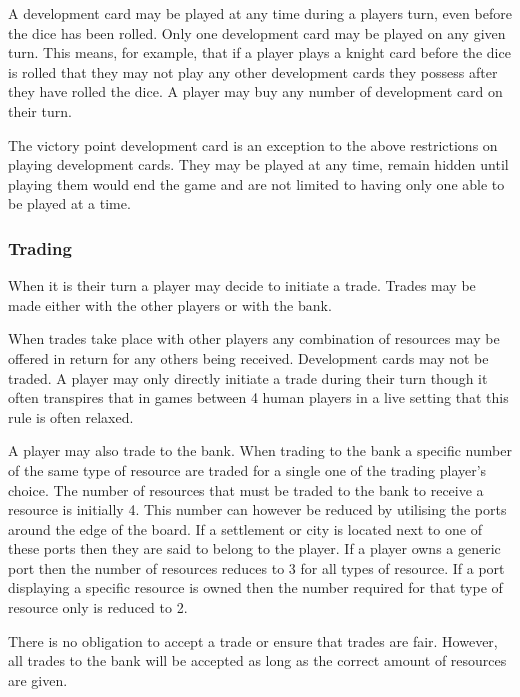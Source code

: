 \documentclass[]{article}
\begin{document}
\par A development card may be played at any time during a players turn, even before the dice has been rolled. Only one development card may be played on any given turn. This means, for example, that if a player plays a knight card before the dice is rolled that they may not play any other development cards they possess after they have rolled the dice. A player may buy any number of development card on their turn.

\par The victory point development card is an exception to the above restrictions on playing development cards. They may be played at any time, remain hidden until playing them would end the game and are not limited to having only one able to be played at a time.

\subsubsection{Trading}
When it is their turn a player may decide to initiate a trade. Trades may be made either with the other players or with the bank.

\par When trades take place with other players any combination of resources may be offered in return for any others being received. Development cards may not be traded. A player may only directly initiate a trade during their turn though it often transpires that in games between 4 human players in a live setting that this rule is often relaxed.

\par A player may also trade to the bank. When trading to the bank a specific number of the same type of resource are traded for a single one of the trading player's choice. The number of resources that must be traded to the bank to receive a resource is initially 4. This number can however be reduced by utilising the ports around the edge of the board. If a settlement or city is located next to one of these ports then they are said to belong to the player. If a player owns a generic port then the number of resources reduces to 3 for all types of resource. If a port displaying a specific resource is owned then the number required for that type of resource only is reduced to 2.

\par There is no obligation to accept a trade or ensure that trades are fair. However, all trades to the bank will be accepted as long as the correct amount of resources are given.
\end{document}
